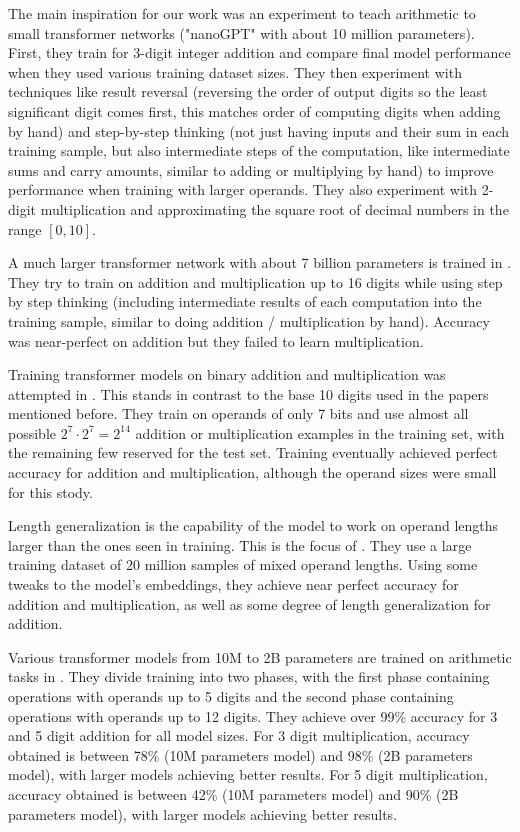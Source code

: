 The main inspiration for our work was an experiment \cite{teaching}  to teach arithmetic to small transformer networks ("nanoGPT" with about 10 million parameters). First, they train for 3-digit integer addition and compare final model performance when they used various training dataset sizes. They then experiment with techniques like result reversal (reversing the order of output digits so the least significant digit comes first, this matches order of computing digits when adding by hand) and step-by-step thinking (not just having inputs and their sum in each training sample, but also intermediate steps of the computation, like intermediate sums and carry amounts, similar to adding or multiplying by hand) to improve performance when training with larger operands. They also experiment with 2-digit multiplication and approximating the square root of decimal numbers in the range $[0,10]$.

A much larger transformer network with about 7 billion parameters is trained in \cite{goat}. They try to train on addition and multiplication up to 16 digits while using step by step thinking (including intermediate results of each computation into the training sample, similar to doing addition / multiplication by hand). Accuracy was near-perfect on addition but they failed to learn multiplication.

Training transformer models on binary addition and multiplication was attempted in \cite{memtocomp}. This stands in contrast to the base 10 digits used in the papers mentioned before. They train on operands of only 7 bits and use almost all possible $2^7 \cdot 2^7 = 2^{14}$ addition or multiplication examples in the training set, with the remaining few reserved for the test set. Training eventually achieved perfect accuracy for addition and multiplication, although the operand sizes were small for this stody.

 Length generalization is the capability of the model to work on operand lengths larger than the ones seen in training. This is the focus of \cite{rightembeddings}. They use a large training dataset of 20 million samples of mixed operand lengths. Using some tweaks to the model's embeddings, they achieve near perfect accuracy for addition and multiplication, as well as some degree of length generalization for addition.

Various transformer models from 10M to 2B parameters are trained on arithmetic tasks in \cite{nocalculator}. They divide training into two phases, with the first phase containing operations with operands up to 5 digits and the second phase containing operations with operands up to 12 digits. They achieve over 99\% accuracy for 3 and 5 digit addition for all model sizes. For 3 digit multiplication, accuracy obtained is between 78\% (10M parameters model) and 98\% (2B parameters model), with larger models achieving better results.
For 5 digit multiplication, accuracy obtained is between 42\% (10M parameters model) and 90\% (2B parameters model), with larger models achieving better results.

